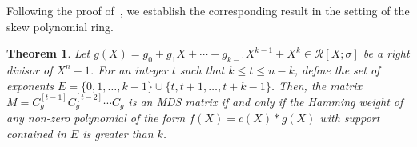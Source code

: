 \documentclass[11pt]{article}
\newtheorem{theorem}{Theorem}
\begin{document}
Following the proof of~\cite[Theorem~2]{gupta2017towards}, we establish the corresponding result in the setting of the skew polynomial ring.

\begin{theorem}\label{equivalent condition}  Let $g(X)=g_0+g_1X+\cdots+g_{k-1}X^{k-1}+X^k \in \mathcal{R}[X; \sigma]$ be a  right divisor of $X^n - 1$. For an integer $t$ such that $k \leq t \leq n-k$, define the set of exponents $E = \{0, 1, \dots, k-1\} \cup \{t, t+1, \dots, t+k-1\}$. Then, the matrix $M = C_g^{[t-1]} C_g^{[t-2]} \cdots C_g$ is an MDS matrix if and only if the Hamming weight of any non-zero polynomial of the form $f(X) = c(X)\ast g(X)$ with support contained in $E$ is greater than $k$. 
\end{theorem}
\end{document}
